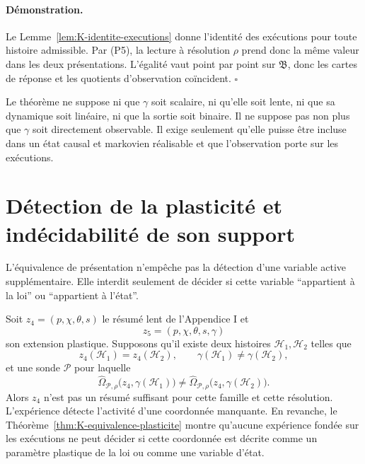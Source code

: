 \paragraph{Démonstration.}
Le Lemme~\ref{lem:K-identite-executions} donne l'identité des exécutions pour toute histoire
admissible. Par (P5), la lecture à résolution $\rho$ prend donc la même
valeur dans les deux présentations. L'égalité vaut point par point sur
$\mathfrak B$, donc les cartes de réponse et les quotients d'observation
coïncident. \hfill$\square$

\begin{encadre}[title={Ce que le théorème ne suppose pas}]
Le théorème ne suppose ni que $\gamma$ soit scalaire, ni qu'elle soit
lente, ni que sa dynamique soit linéaire, ni que la sortie soit binaire.
Il ne suppose pas non plus que $\gamma$ soit directement observable. Il
exige seulement qu'elle puisse être incluse dans un état causal et
markovien réalisable et que l'observation porte sur les exécutions.
\end{encadre}

\section{Détection de la plasticité et indécidabilité de son support}
\label{annexe-K-detection}

L'équivalence de présentation n'empêche pas la détection d'une variable
active supplémentaire. Elle interdit seulement de décider si cette
variable ``appartient à la loi'' ou ``appartient à l'état''.

Soit $z_4=(p,\chi,\theta,s)$ le résumé lent de l'Appendice I et
\[
z_5=(p,\chi,\theta,s,\gamma)
\]
son extension plastique. Supposons qu'il existe deux histoires
$\mathcal H_1,\mathcal H_2$ telles que
\[
z_4(\mathcal H_1)=z_4(\mathcal H_2),
\qquad
\gamma(\mathcal H_1)\neq\gamma(\mathcal H_2),
\]
et une sonde $\mathcal P$ pour laquelle
\[
\widehat\Omega_{\mathcal P,\rho}
\bigl(z_4,\gamma(\mathcal H_1)\bigr)
\neq
\widehat\Omega_{\mathcal P,\rho}
\bigl(z_4,\gamma(\mathcal H_2)\bigr).
\]
Alors $z_4$ n'est pas un résumé suffisant pour cette famille et cette
résolution. L'expérience détecte l'activité d'une coordonnée manquante.
En revanche, le Théorème~\ref{thm:K-equivalence-plasticite} montre qu'aucune expérience fondée sur
les exécutions ne peut décider si cette coordonnée est décrite comme un
paramètre plastique de la loi ou comme une variable d'état.

